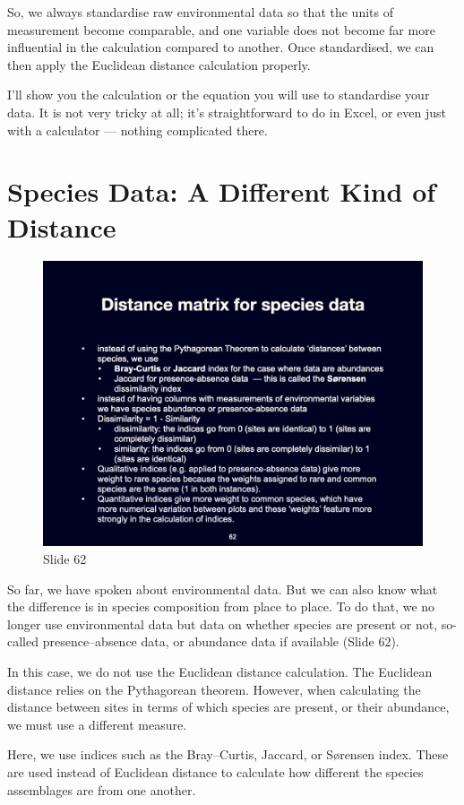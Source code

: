 \documentclass[
  10pt,
]{book}
\begin{document}
So, we always standardise raw environmental data so that the units of
measurement become comparable, and one variable does not become far more
influential in the calculation compared to another. Once standardised,
we can then apply the Euclidean distance calculation properly.

I'll show you the calculation or the equation you will use to
standardise your data. It is not very tricky at all; it's
straightforward to do in Excel, or even just with a calculator ---
nothing complicated there.

\section{Species Data: A Different Kind of
Distance}\label{species-data-a-different-kind-of-distance}

\begin{figure}[ht]
\centering
\includegraphics[width=0.8\linewidth]{../images/BDC334/BDC334-062.jpeg}
\caption*{Slide 62}
\end{figure}

So far, we have spoken about environmental data. But we can also know
what the difference is in species composition from place to place. To do
that, we no longer use environmental data but data on whether species
are present or not, so-called presence--absence data, or abundance data
if available (Slide 62).

In this case, we do not use the Euclidean distance calculation. The
Euclidean distance relies on the Pythagorean theorem. However, when
calculating the distance between sites in terms of which species are
present, or their abundance, we must use a different measure.

Here, we use indices such as the Bray--Curtis, Jaccard, or Sørensen
index. These are used instead of Euclidean distance to calculate how
different the species assemblages are from one another.
\end{document}
